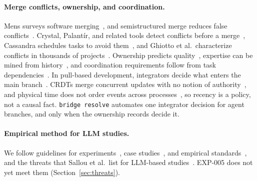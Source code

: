 \paragraph{Merge conflicts, ownership, and coordination.}
Mens surveys software merging~\cite{mens2002merging}, and semistructured merge reduces false conflicts~\cite{apel2011semistructured}. Crystal, Palant\'{i}r, and related tools detect conflicts before a merge~\cite{brun2011proactive,sarma2012palantir,guimaraes2012early}, Cassandra schedules tasks to avoid them~\cite{kasi2013cassandra}, and Ghiotto et al.\ characterize conflicts in thousands of projects~\cite{ghiotto2020merge}. Ownership predicts quality~\cite{bird2011ownership}, expertise can be mined from history~\cite{mockus2002expertise}, and coordination requirements follow from task dependencies~\cite{cataldo2006coordination}. In pull-based development, integrators decide what enters the main branch~\cite{gousios2015integrator}. CRDTs merge concurrent updates with no notion of authority~\cite{shapiro2011crdt}, and physical time does not order events across processes~\cite{lamport1978time}, so recency is a policy, not a causal fact. \texttt{bridge resolve} automates one integrator decision for agent branches, and only when the ownership records decide it.

\paragraph{Empirical method for LLM studies.}
We follow guidelines for experiments~\cite{wohlin2012experimentation}, case studies~\cite{runeson2009case}, and empirical standards~\cite{ralph2020standards}, and the threats that Sallou et al.\ list for LLM-based studies~\cite{sallou2024breaking}. EXP-005 does not yet meet them (Section~\ref{sec:threats}).
